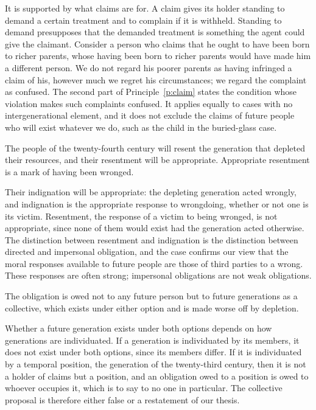 \documentclass{situationist-preprint}
\begin{document}
\begin{reply}
It is supported by what claims are for. A claim gives its holder standing to demand a certain treatment and to complain if it is withheld. Standing to demand presupposes that the demanded treatment is something the agent could give the claimant. Consider a person who claims that he ought to have been born to richer parents, whose having been born to richer parents would have made him a different person. We do not regard his poorer parents as having infringed a claim of his, however much we regret his circumstances; we regard the complaint as confused. The second part of Principle~\ref{p:claim} states the condition whose violation makes such complaints confused. It applies equally to cases with no intergenerational element, and it does not exclude the claims of future people who will exist whatever we do, such as the child in the buried-glass case.
\end{reply}

\begin{objection}
The people of the twenty-fourth century will resent the generation that depleted their resources, and their resentment will be appropriate. Appropriate resentment is a mark of having been wronged.
\end{objection}

\begin{reply}
Their indignation will be appropriate: the depleting generation acted wrongly, and indignation is the appropriate response to wrongdoing, whether or not one is its victim. Resentment, the response of a victim to being wronged, is not appropriate, since none of them would exist had the generation acted otherwise. The distinction between resentment and indignation is the distinction between directed and impersonal obligation, and the case confirms our view that the moral responses available to future people are those of third parties to a wrong. These responses are often strong; impersonal obligations are not weak obligations.
\end{reply}

\begin{objection}
The obligation is owed not to any future person but to future generations as a collective, which exists under either option and is made worse off by depletion.
\end{objection}

\begin{reply}
Whether a future generation exists under both options depends on how generations are individuated. If a generation is individuated by its members, it does not exist under both options, since its members differ. If it is individuated by a temporal position, the generation of the twenty-third century, then it is not a holder of claims but a position, and an obligation owed to a position is owed to whoever occupies it, which is to say to no one in particular. The collective proposal is therefore either false or a restatement of our thesis.
\end{reply}
\end{document}
